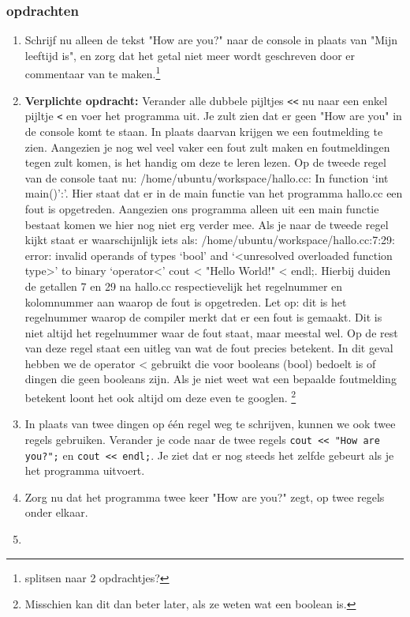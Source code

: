 \documentclass[12pt,a4paper]{article}
\newcommand{\icode}{\lstinline}
\begin{document}
\subsubsection{opdrachten}
\begin{enumerate}
		\item
			Schrijf nu alleen de tekst "How are you?" naar de console in plaats van "Mijn leeftijd is", en zorg dat het getal niet meer wordt geschreven door er commentaar van te maken.\footnote{splitsen naar 2 opdrachtjes?}
		\item 
			\textbf{Verplichte opdracht:} Verander alle dubbele pijltjes \icode{<<} nu naar een enkel pijltje \icode{<} en voer het programma uit. Je zult zien dat er geen "How are you" in de console komt te staan. In plaats daarvan krijgen we een foutmelding te zien. Aangezien je nog wel veel vaker een fout zult maken en foutmeldingen tegen zult komen, is het handig om deze te leren lezen. Op de tweede regel van de console taat nu: /home/ubuntu/workspace/hallo.cc: In function ‘int main()’:'. Hier staat dat er in de main functie van het programma hallo.cc een fout is opgetreden. Aangezien ons programma alleen uit een main functie bestaat komen we hier nog niet erg verder mee. Als je naar de tweede regel kijkt staat er waarschijnlijk iets als: /home/ubuntu/workspace/hallo.cc:7:29: error: invalid operands of types ‘bool’ and ‘<unresolved overloaded function type>’ to binary ‘operator<' cout < "Hello World!" < endl;. Hierbij duiden de getallen 7 en 29 na hallo.cc respectievelijk het regelnummer en kolomnummer aan waarop de fout is opgetreden. Let op: dit is het regelnummer waarop de compiler merkt dat er een fout is gemaakt. Dit is niet altijd het regelnummer waar de fout staat, maar meestal wel. Op de rest van deze regel staat een uitleg van wat de fout precies betekent. In dit geval hebben we de operator < gebruikt die voor booleans (bool) bedoelt is of dingen die geen booleans zijn. Als je niet weet wat een bepaalde foutmelding betekent loont het ook altijd om deze even te googlen. \footnote{Misschien kan dit dan beter later, als ze weten wat een boolean is.}
		\item
			In plaats van twee dingen op \'e\'en regel weg te schrijven, kunnen we ook twee regels gebruiken. Verander je code naar de twee regels \icode{cout << "How are you?";} en \icode{cout << endl;}. Je ziet dat er nog steeds het zelfde gebeurt als je het programma uitvoert.
		\item
			Zorg nu dat het programma twee keer "How are you?" zegt, op twee regels onder elkaar.
		\item

\end{enumerate}
\end{document}
